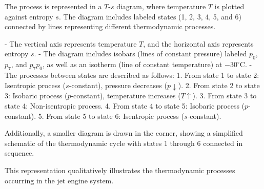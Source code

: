 The process is represented in a \( T \)-\( s \) diagram, where temperature \( T \) is plotted against entropy \( s \). The diagram includes labeled states (1, 2, 3, 4, 5, and 6) connected by lines representing different thermodynamic processes.  

- The vertical axis represents temperature \( T \), and the horizontal axis represents entropy \( s \).  
- The diagram includes isobars (lines of constant pressure) labeled \( p_0 \), \( p_7 \), and \( p_7p_0 \), as well as an isotherm (line of constant temperature) at \( -30^\circ\text{C} \).  
- The processes between states are described as follows:  
  1. From state 1 to state 2: Isentropic process (\( s \)-constant), pressure decreases (\( p \downarrow \)).  
  2. From state 2 to state 3: Isobaric process (\( p \)-constant), temperature increases (\( T \uparrow \)).  
  3. From state 3 to state 4: Non-isentropic process.  
  4. From state 4 to state 5: Isobaric process (\( p \)-constant).  
  5. From state 5 to state 6: Isentropic process (\( s \)-constant).  

Additionally, a smaller diagram is drawn in the corner, showing a simplified schematic of the thermodynamic cycle with states 1 through 6 connected in sequence.  

This representation qualitatively illustrates the thermodynamic processes occurring in the jet engine system.